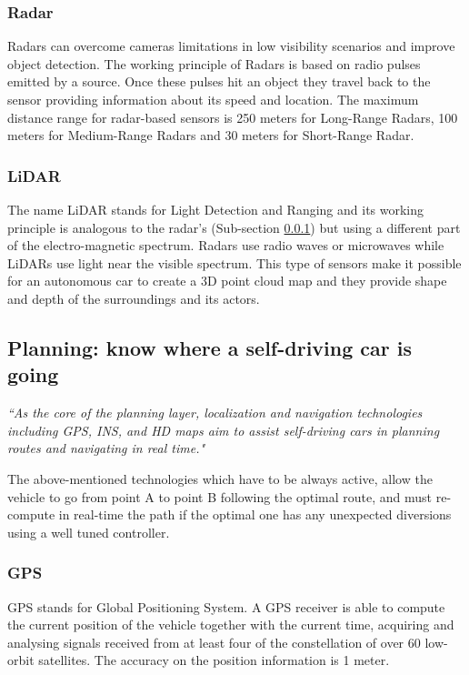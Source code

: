 \subsubsection{Radar} \label{radar}
Radars can overcome cameras limitations in low visibility scenarios and improve object detection.
The working principle of Radars is based on radio pulses emitted by a source. Once these pulses hit an object they travel back to the sensor providing information about its speed and location. 
The maximum distance range for radar-based sensors is 250 meters for Long-Range Radars, 100 meters for Medium-Range Radars and 30 meters for Short-Range Radar.

\subsubsection{LiDAR}
The name LiDAR stands for Light Detection and Ranging and its working principle is analogous to the radar's (Sub-section \ref{radar}) but using a different part of the electro-magnetic spectrum. Radars use radio waves or microwaves while LiDARs use light near the visible spectrum.
This type of sensors make it possible for an autonomous car to create a 3D point cloud map and they provide shape and depth of the surroundings and its actors.

\subsection{Planning: know where a self-driving car is going}

\textit{``As the core of the planning layer, localization and navigation technologies including GPS, INS, and HD maps aim to assist self-driving cars in planning routes and navigating in real time."} \cite{luo2019localization}

\vspace{2mm}

The above-mentioned technologies which have to be always active, allow the vehicle to go from point A to point B following the optimal route, and must re-compute in real-time the path if the optimal one has any unexpected diversions using a well tuned controller.

\subsubsection{GPS}
GPS stands for Global Positioning System. A GPS receiver is able to compute the current position of the vehicle together with the current time, acquiring and analysing signals received from at least four of the constellation of over 60 low-orbit satellites. 
The accuracy on the position information is 1 meter.


